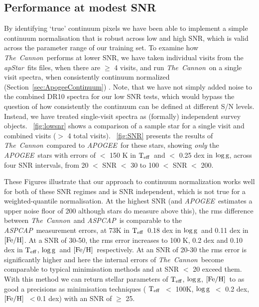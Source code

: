 \documentclass[12pt, preprint]{aastex}
\newcommand{\sectionname}{Section}
\newcommand{\teff}{\mbox{$\rm T_{eff}$}}
\newcommand{\feh}{\mbox{$\rm [Fe/H]$}}
\newcommand{\logg}{\mbox{$\rm \log g$}}
\newcommand{\tc}{\textsl{The~Cannon}}
\newcommand{\apogee}{\textsl{APOGEE}}
\newcommand{\aspcap}{\textsl{ASPCAP}}
\newcommand{\apstar}{\textsl{apStar}}
\begin{document}
 \subsection{Performance at modest SNR}
 \label{sec:lowSNR}


By identifying `true' continuum pixels we have been able to implement a simple continuum normalisation that is robust across low and high SNR, which is valid across the parameter range of our training set. To examine how \tc\ performs at lower SNR, we have taken individual visits from the \apstar\ fits files, when there are $\ge$ 4 visits, and run \tc\ on a single visit spectra, when consistently continuum normalized (\sectionname~\ref{sec:ApogeeContinuum}) . Note, that we have not simply added noise to the combined DR10 spectra for our low SNR tests, which would bypass the question of how consistently the continuum can be defined at different S/N levels. Instead, we have treated single-visit spectra as (formally) independent survey objects. \figurename~\ref{fig:lowsnr} shows a comparison of a sample star for a single visit and combined visits ($>$ 4 total visits). \figurename~\ref{fig:SNR} presents the results of \tc\ compared to \apogee\ for these stars, showing \textit{only} the \apogee\ stars with errors of $<$ 150 K in \teff\ and $<$ 0.25 dex in \logg, across four SNR intervals, from 20 $<$ SNR $<$ 30 to 100 $<$ SNR $<$ 200.

These Figures illustrate that our approach to continuum normalization works well for both of these SNR regimes and is SNR independent, which is not true for a weighted-quantile normalisation. At the highest SNR (and \apogee\ estimates a upper noise floor of 200 although stars do measure above this), the rms difference between \tc\ and \aspcap\ is comparable to the \aspcap\ measurement errors, at 73K in \teff\, 0.18 dex in \logg\ and 0.11 dex in \feh. At a SNR of 30-50, the rms error increases to 100 K, 0.2 dex and 0.10 dex in \teff, \logg\ and \feh\, respectively. At an SNR of 20-30 the rms error is significantly higher and here the internal errors of \tc\ become comparable to typical minimisation methods and at SNR $<$ 20 exceed them. With this method we can return stellar parameters of \teff, \logg, \feh\ to as good a precisions as minimisation techniques ( \teff\ $<$ 100K, \logg\ $<$ 0.2 dex, \feh\ $< $0.1 dex) with an SNR of $\ge$ 25. 
 
\end{document}
